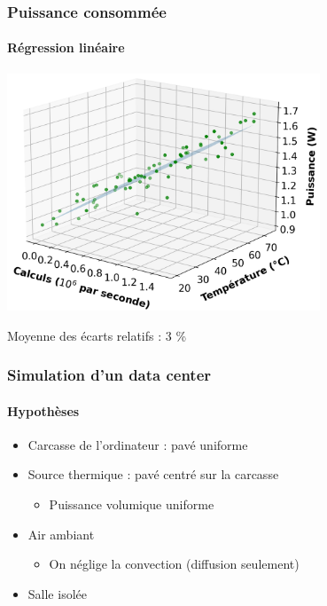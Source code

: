 \documentclass[a4paper,11pt]{beamer}
\begin{document}
\begin{frame}
    \frametitle{Puissance consommée}
    \framesubtitle{Régression linéaire}

    \begin{center}
        \includegraphics[width=0.7\textwidth]{regression_cube.png}

        Moyenne des écarts relatifs : 3 \%
    \end{center}
\end{frame}

\begin{frame}
    \frametitle{Simulation d'un data center}
    \framesubtitle{Hypothèses}

    \begin{itemize}
        \item Carcasse de l'ordinateur : pavé uniforme
        \item Source thermique : pavé centré sur la carcasse
        \begin{itemize}
            \item Puissance volumique uniforme
        \end{itemize}
        \item Air ambiant
        \begin{itemize}
            \item On néglige la convection (diffusion seulement)
        \end{itemize}
        \item Salle isolée
    \end{itemize}
\end{frame}
\end{document}
